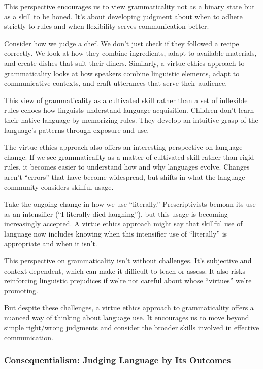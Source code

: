 This perspective encourages us to view grammaticality not as a binary state but as a skill to be honed. It's about developing judgment about when to adhere strictly to rules and when flexibility serves communication better.

Consider how we judge a chef. We don't just check if they followed a recipe correctly. We look at how they combine ingredients, adapt to available materials, and create dishes that suit their diners. Similarly, a virtue ethics approach to grammaticality looks at how speakers combine linguistic elements, adapt to communicative contexts, and craft utterances that serve their audience.

This view of grammaticality as a cultivated skill rather than a set of inflexible rules echoes how linguists understand language acquisition. Children don't learn their native language by memorizing rules. They develop an intuitive grasp of the language's patterns through exposure and use.

The virtue ethics approach also offers an interesting perspective on language change. If we see grammaticality as a matter of cultivated skill rather than rigid rules, it becomes easier to understand how and why languages evolve. Changes aren't ``errors'' that have become widespread, but shifts in what the language community considers skillful usage.

Take the ongoing change in how we use ``literally.'' Prescriptivists bemoan its use as an intensifier (``I literally died laughing''), but this usage is becoming increasingly accepted. A virtue ethics approach might say that skillful use of language now includes knowing when this intensifier use of ``literally'' is appropriate and when it isn't.

This perspective on grammaticality isn't without challenges. It's subjective and context-dependent, which can make it difficult to teach or assess. It also risks reinforcing linguistic prejudices if we're not careful about whose ``virtues'' we're promoting.

But despite these challenges, a virtue ethics approach to grammaticality offers a nuanced way of thinking about language use. It encourages us to move beyond simple right/wrong judgments and consider the broader skills involved in effective communication. 

\subsubsection{Consequentialism: Judging Language by Its Outcomes}

